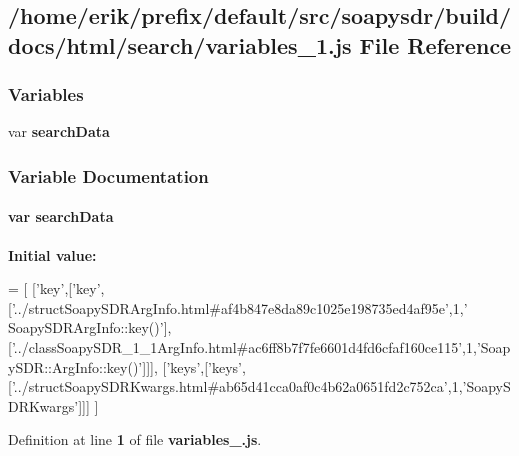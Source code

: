 \subsection{/home/erik/prefix/default/src/soapysdr/build/docs/html/search/variables\+\_\+1.js File Reference}
\label{variables__1_8js}
\subsubsection*{Variables}
\begin{DoxyCompactItemize}
\item 
var {\bf search\+Data}
\end{DoxyCompactItemize}


\subsubsection{Variable Documentation}
\paragraph[{search\+Data}]{\setlength{\rightskip}{0pt plus 5cm}var search\+Data}\label{variables__1_8js_ad01a7523f103d6242ef9b0451861231e}
{\bfseries Initial value\+:}
\begin{DoxyCode}
=
[
  [\textcolor{stringliteral}{'key'},[\textcolor{stringliteral}{'key'},[\textcolor{stringliteral}{'../structSoapySDRArgInfo.html#af4b847e8da89c1025e198735ed4af95e'},1,\textcolor{stringliteral}{'
      SoapySDRArgInfo::key()'}],[\textcolor{stringliteral}{'../classSoapySDR\_1\_1ArgInfo.html#ac6ff8b7f7fe6601d4fd6cfaf160ce115'},1,\textcolor{stringliteral}{'SoapySDR::ArgInfo::key()'}]]],
  [\textcolor{stringliteral}{'keys'},[\textcolor{stringliteral}{'keys'},[\textcolor{stringliteral}{'../structSoapySDRKwargs.html#ab65d41cca0af0c4b62a0651fd2c752ca'},1,\textcolor{stringliteral}{'SoapySDRKwargs'}]]]
]
\end{DoxyCode}


Definition at line {\bf 1} of file {\bf variables\+\_.\+js}.

